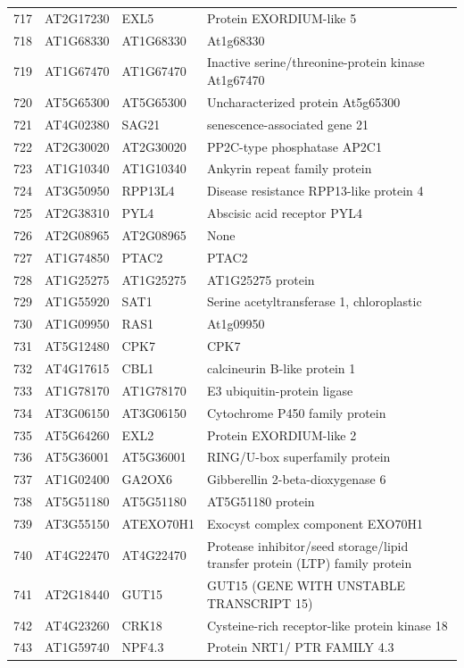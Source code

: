 \documentclass[11pt]{article}
\begin{document}
\begin{center}
\begin{tabular}{rlll}
717 & AT2G17230 & EXL5 & Protein EXORDIUM-like 5\\
718 & AT1G68330 & AT1G68330 & At1g68330\\
719 & AT1G67470 & AT1G67470 & Inactive serine/threonine-protein kinase At1g67470\\
720 & AT5G65300 & AT5G65300 & Uncharacterized protein At5g65300\\
721 & AT4G02380 & SAG21 & senescence-associated gene 21\\
722 & AT2G30020 & AT2G30020 & PP2C-type phosphatase AP2C1\\
723 & AT1G10340 & AT1G10340 & Ankyrin repeat family protein\\
724 & AT3G50950 & RPP13L4 & Disease resistance RPP13-like protein 4\\
725 & AT2G38310 & PYL4 & Abscisic acid receptor PYL4\\
726 & AT2G08965 & AT2G08965 & None\\
727 & AT1G74850 & PTAC2 & PTAC2\\
728 & AT1G25275 & AT1G25275 & AT1G25275 protein\\
729 & AT1G55920 & SAT1 & Serine acetyltransferase 1, chloroplastic\\
730 & AT1G09950 & RAS1 & At1g09950\\
731 & AT5G12480 & CPK7 & CPK7\\
732 & AT4G17615 & CBL1 & calcineurin B-like protein 1\\
733 & AT1G78170 & AT1G78170 & E3 ubiquitin-protein ligase\\
734 & AT3G06150 & AT3G06150 & Cytochrome P450 family protein\\
735 & AT5G64260 & EXL2 & Protein EXORDIUM-like 2\\
736 & AT5G36001 & AT5G36001 & RING/U-box superfamily protein\\
737 & AT1G02400 & GA2OX6 & Gibberellin 2-beta-dioxygenase 6\\
738 & AT5G51180 & AT5G51180 & AT5G51180 protein\\
739 & AT3G55150 & ATEXO70H1 & Exocyst complex component EXO70H1\\
740 & AT4G22470 & AT4G22470 & Protease inhibitor/seed storage/lipid transfer protein (LTP) family protein\\
741 & AT2G18440 & GUT15 & GUT15 (GENE WITH UNSTABLE TRANSCRIPT 15)\\
742 & AT4G23260 & CRK18 & Cysteine-rich receptor-like protein kinase 18\\
743 & AT1G59740 & NPF4.3 & Protein NRT1/ PTR FAMILY 4.3\\

\end{tabular}
\end{center}
\end{document}
